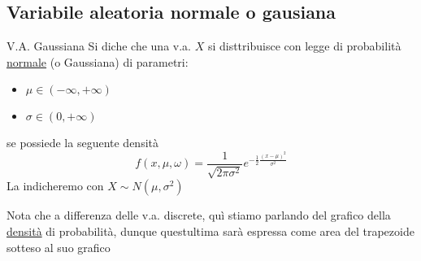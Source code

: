 

\subsection{Variabile aleatoria normale o gausiana}
\label{vagaussiana}
\begin{definizione}{V.A. Gaussiana}
	Si diche che una v.a. $ X $ si disttribuisce con legge di probabilità \underline{normale} (o Gaussiana) di parametri:
	\begin{itemize}
		\item $ \mu \in \left(-\infty , +\infty \right) $
		\item $ \sigma  \in \left(0, +\infty \right) $
	\end{itemize}
	se possiede la seguente densità
	\[
		f\left(x, \mu , \omega \right) = \frac{1}{\sqrt{2 \pi \sigma ^2 }}e ^{\displaystyle-\frac{1}{2}\frac{\left(x-\mu \right)^2}{\sigma ^2 }}
	\]
	La indicheremo con $X \sim N \left(\mu , \sigma ^2 \right) $
\end{definizione}
Nota che a differenza delle v.a. discrete, quì stiamo parlando del grafico della \underline{densità} di probabilità, dunque questultima sarà espressa come area del trapezoide sotteso al suo grafico
